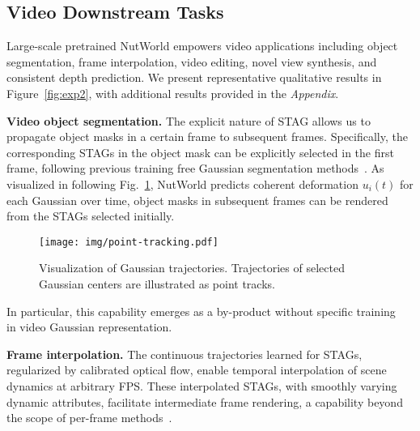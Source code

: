 

\subsection{Video Downstream Tasks} 

Large-scale pretrained NutWorld empowers video applications including object segmentation, frame interpolation, video editing, novel view synthesis, and consistent depth prediction. We present representative qualitative results in Figure~\ref{fig:exp2}, with additional results provided in the \textit{Appendix}.

\noindent \textbf{Video object segmentation.} The explicit nature of STAG allows us to propagate object masks in a certain frame to subsequent frames. Specifically, the corresponding STAGs in the object mask can be explicitly selected in the first frame, following previous training free Gaussian segmentation methods~\cite{flashsplat, hu2024semantic}. As visualized in following Fig.~\ref{fig:point-track}, NutWorld predicts coherent deformation $u_i(t)$ for each Gaussian over time, object masks in subsequent frames can be rendered from the STAGs selected initially.
%
\begin{figure}[h!]
\vspace{-4mm}
\setlength{\abovecaptionskip}{0.1cm}
\setlength{\belowcaptionskip}{0cm}
\centering
\texttt{[image: img/point-tracking.pdf]}
\caption{Visualization of Gaussian trajectories. Trajectories of selected Gaussian centers are illustrated as point tracks.}
\vspace{-4mm}
\label{fig:point-track}
\end{figure}
%
In particular, this capability emerges as a by-product without specific training~\cite{sun2024splatter, wang2024gflow} in video Gaussian representation. 



\noindent \textbf{Frame interpolation.} The continuous trajectories learned for STAGs, regularized by calibrated optical flow, enable temporal interpolation of scene dynamics at arbitrary FPS. These interpolated STAGs, with smoothly varying dynamic attributes, facilitate intermediate frame rendering, a capability beyond the scope of per-frame methods~\cite{ren2024l4gm}.


